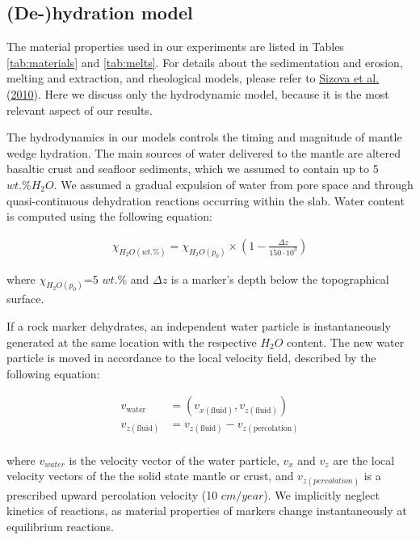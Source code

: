 \documentclass[draft,linenumbers]{agujournal2018}
\begin{document}
\clearpage

\hypertarget{sec:dhydration}{%
\subsection{(De-)hydration model}\label{sec:dhydration}}

The material properties used in our experiments are listed in Tables
\ref{tab:materials} and \ref{tab:melts}. For details about the
sedimentation and erosion, melting and extraction, and rheological
models, please refer to \protect\hyperlink{ref-Sizova2010}{Sizova et
al.} (\protect\hyperlink{ref-Sizova2010}{2010}). Here we discuss only
the hydrodynamic model, because it is the most relevant aspect of our
results.

The hydrodynamics in our models controls the timing and magnitude of
mantle wedge hydration. The main sources of water delivered to the
mantle are altered basaltic crust and seafloor sediments, which we
assumed to contain up to 5 \(wt.\% H_{2}O\). We assumed a gradual
expulsion of water from pore space and through quasi-continuous
dehydration reactions occurring within the slab. Water content is
computed using the following equation:

\[\begin{aligned}\chi_{H_{2}O(wt.\%)} = \chi_{H_{2}O(p_{0})} \times \left( 1 - \frac{\Delta z}{150 \cdot 10^{3}} \right)\end{aligned}\]

where \(\chi_{H_{2}O(p_{0})}\)=5 \(wt.\%\) and \(\Delta z\) is a
marker's depth below the topographical surface.

If a rock marker dehydrates, an independent water particle is
instantaneously generated at the same location with the respective
\(H_{2}O\) content. The new water particle is moved in accordance to the
local velocity field, described by the following equation:

\[\begin{aligned}
v_{\text{water}} & = (v_{x(\text{fluid})},v_{z(\text{fluid})}) \\
v_{z(\text{fluid})} & = v_{z(\text{fluid})} - v_{z(\text{percolation})} \\
\end{aligned}\]

where \(v_{water}\) is the velocity vector of the water particle,
\(v_{x}\) and \(v_{z}\) are the local velocity vectors of the the solid
state mantle or crust, and \(v_{z(percolation)}\) is a prescribed upward
percolation velocity (10 \(cm/year\)). We implicitly neglect kinetics of
reactions, as material properties of markers change instantaneously at
equilibrium reactions.
\end{document}
